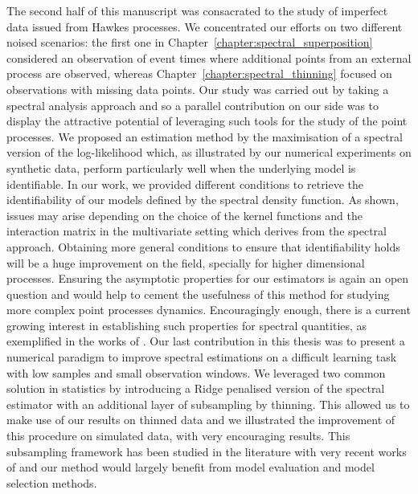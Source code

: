 The second half of this manuscript was consacrated to the study of imperfect data issued from Hawkes processes.
We concentrated our efforts on two different noised scenarios: the first one in Chapter~\ref{chapter:spectral_superposition} considered an observation of event times where additional points from an external process are observed, whereas Chapter~\ref{chapter:spectral_thinning} focused on observations with missing data points.
Our study was carried out by taking a spectral analysis approach and so a parallel contribution on our side was to display the attractive potential of leveraging such tools for the study of the point processes.
We proposed an estimation method by the maximisation of a spectral version of the log-likelihood which, as illustrated by our numerical experiments on synthetic data, perform particularly well when the underlying model is identifiable.
In our work, we provided different conditions to retrieve the identifiability of our models defined by the spectral density function. 
As shown, issues may arise depending on the choice of the kernel functions and the interaction matrix in the multivariate setting which derives from the spectral approach. Obtaining more general conditions to ensure that identifiability holds will be a huge improvement on the field, specially for higher dimensional processes.
Ensuring the asymptotic properties for our estimators is again an open question and would help to cement the usefulness of this method for studying more complex point processes dynamics. 
Encouragingly enough, there is a current growing interest in establishing such properties for spectral quantities, as exemplified in the works of \textcite{Yang2024}.
Our last contribution in this thesis was to present a numerical paradigm to improve spectral estimations on a difficult learning task with low samples and small observation windows.
We leveraged two common solution in statistics by introducing a Ridge penalised version of the spectral estimator with an additional layer of subsampling by thinning.
This allowed us to make use of our results on thinned data and we illustrated the improvement of this procedure on simulated data, with very encouraging results.
This subsampling framework has been studied in the literature with very recent works of \textcite{Cronie2024, Coeurjolly2024} and our method would largely benefit from model evaluation and model selection methods. 

    
